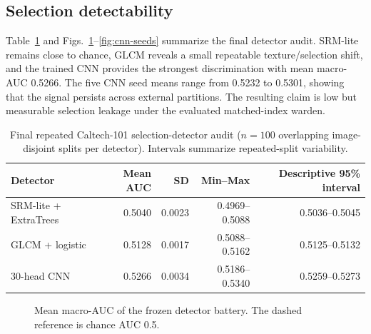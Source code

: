 \subsection{Selection detectability}

Table~\ref{tab:detectors} and Figs.~\ref{fig:detectors}--\ref{fig:cnn-seeds} summarize the final detector audit. SRM-lite remains close to chance, GLCM reveals a small repeatable texture/selection shift, and the trained CNN provides the strongest discrimination with mean macro-AUC 0.5266. The five CNN seed means range from 0.5232 to 0.5301, showing that the signal persists across external partitions. The resulting claim is low but measurable selection leakage under the evaluated matched-index warden.

\begin{table}[t]
\caption{Final repeated Caltech-101 selection-detector audit ($n=100$ overlapping image-disjoint splits per detector). Intervals summarize repeated-split variability.}
\label{tab:detectors}
\small
\begin{tabular}{@{}lrrrr@{}}
\toprule
Detector & Mean AUC & SD & Min--Max & Descriptive 95\% interval \\
\midrule
SRM-lite + ExtraTrees & 0.5040 & 0.0023 & 0.4969--0.5088 & 0.5036--0.5045 \\
GLCM + logistic       & 0.5128 & 0.0017 & 0.5088--0.5162 & 0.5125--0.5132 \\
30-head CNN           & 0.5266 & 0.0034 & 0.5186--0.5340 & 0.5259--0.5273 \\
\bottomrule
\end{tabular}
\end{table}

\begin{figure}[t]
\centering
{}
\caption{Mean macro-AUC of the frozen detector battery. The dashed reference is chance AUC 0.5.}
\label{fig:detectors}
\end{figure}

